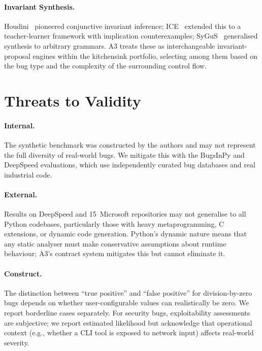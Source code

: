 \documentclass[sigconf,review,anonymous]{acmart}
\begin{document}
\paragraph{Invariant Synthesis.}
Houdini~\cite{flanagan2001houdini} pioneered conjunctive invariant inference; ICE~\cite{garg2014ice} extended this to a teacher-learner framework with implication counterexamples; SyGuS~\cite{alur2013syntax} generalised synthesis to arbitrary grammars.
\textsc{A3} treats these as interchangeable invariant-proposal engines within the kitchensink portfolio, selecting among them based on the bug type and the complexity of the surrounding control flow.

\section{Threats to Validity}\label{sec:threats}

\paragraph{Internal.} The synthetic benchmark was constructed by the authors and may not represent the full diversity of real-world bugs. We mitigate this with the BugsInPy and DeepSpeed evaluations, which use independently curated bug databases and real industrial code.

\paragraph{External.} Results on DeepSpeed and 15~Microsoft repositories may not generalise to all Python codebases, particularly those with heavy metaprogramming, C extensions, or dynamic code generation.  Python's dynamic nature means that any static analyser must make conservative assumptions about runtime behaviour; \textsc{A3}'s contract system mitigates this but cannot eliminate it.

\paragraph{Construct.} The distinction between ``true positive'' and ``false positive'' for division-by-zero bugs depends on whether user-configurable values can realistically be zero. We report borderline cases separately.  For security bugs, exploitability assessments are subjective; we report estimated likelihood but acknowledge that operational context (e.g., whether a CLI tool is exposed to network input) affects real-world severity.
\end{document}
